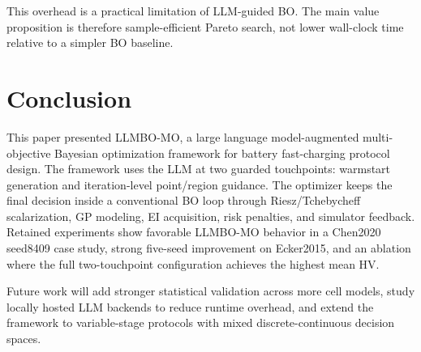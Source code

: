 \documentclass[journal]{IEEEtran}
\begin{document}
This overhead is a practical limitation of LLM-guided BO. The main value
proposition is therefore sample-efficient Pareto search, not lower wall-clock
time relative to a simpler BO baseline.

\section{Conclusion}
\label{sec:conclusion}

This paper presented LLMBO-MO, a large language model-augmented
multi-objective Bayesian optimization framework for battery fast-charging
protocol design. The framework uses the LLM at two guarded touchpoints:
warmstart generation and iteration-level point/region guidance. The optimizer
keeps the final decision inside a conventional BO loop through Riesz/Tchebycheff
scalarization, GP modeling, EI acquisition, risk penalties, and simulator
feedback. Retained experiments show favorable LLMBO-MO behavior in a Chen2020
seed8409 case study, strong five-seed improvement on Ecker2015, and an ablation
where the full two-touchpoint configuration achieves the highest mean HV.

Future work will add stronger statistical validation across more cell models,
study locally hosted LLM backends to reduce runtime overhead, and extend the
framework to variable-stage protocols with mixed discrete-continuous decision
spaces.
\end{document}
